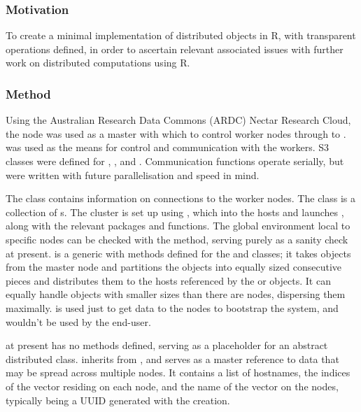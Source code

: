 \subsubsection{Motivation}\label{sec:ds-motivation}

To create a minimal implementation of distributed objects in R, with transparent operations defined, in order to ascertain relevant associated issues with further work on distributed computations using R.

\subsubsection{Method}\label{method}

Using the Australian Research Data Commons (ARDC) Nectar Research
Cloud\cite{nectar2021}, the  node was used as
a master with which to control worker nodes 
through to .   was used as the means
for control and communication with the workers.  S3 classes were
defined for , ,  and
.  Communication functions operate serially,
but were written with future parallelisation and speed in mind.

The  class contains information on connections to the worker nodes.
The  class is a collection of s.
The cluster is set up using , which  into the hosts and launches , along with the relevant packages and functions.
The global environment local to specific nodes can be checked with the  method, serving purely as a sanity check at present.
 is a generic with
methods defined for the  and  classes; it
takes objects from the master node and partitions the objects into
equally sized consecutive pieces and distributes them to the hosts
referenced by the  or  objects.
It can equally handle objects with smaller  sizes than there are nodes, dispersing them maximally.
 is used just to get
data to the nodes to bootstrap the system, and wouldn't be used by the
end-user.

 at present has no methods defined, serving
as a placeholder for an abstract distributed class.
 inherits from ,
and serves as a master reference to data that may be spread across
multiple nodes.
It contains a list of hostnames, the indices of the vector residing on each node, and the name of the vector on the nodes, typically being a UUID generated with the  creation.

